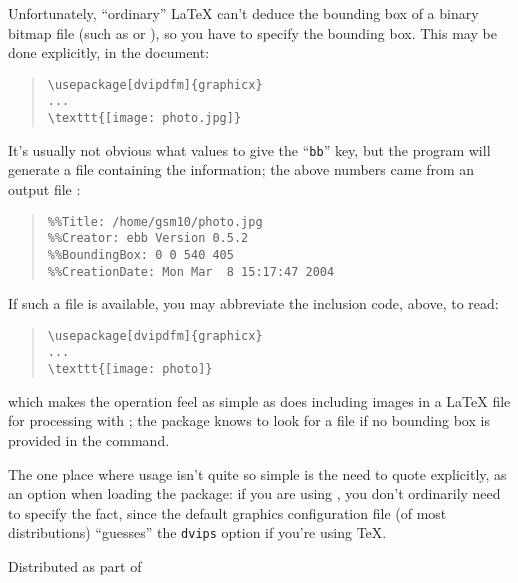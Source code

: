Unfortunately, ``ordinary'' \LaTeX{} can't deduce the bounding box of
a binary bitmap file (such as  or ), so you have
to specify the bounding box.  This may be done explicitly, in the
document:
\begin{quote}
\begin{verbatim}
\usepackage[dvipdfm]{graphicx}
...
\texttt{[image: photo.jpg]}
\end{verbatim}
\end{quote}
It's usually not obvious what values to give the ``\texttt{bb}'' key,
but the program  will generate a file
containing the information; the above numbers came from an
 output file :
\begin{quote}
\begin{verbatim}
%%Title: /home/gsm10/photo.jpg
%%Creator: ebb Version 0.5.2
%%BoundingBox: 0 0 540 405
%%CreationDate: Mon Mar  8 15:17:47 2004
\end{verbatim}
\end{quote}
If such a file is available, you may abbreviate the inclusion
code, above, to read:
\begin{quote}
\begin{verbatim}
\usepackage[dvipdfm]{graphicx}
...
\texttt{[image: photo]}
\end{verbatim}
\end{quote}
which makes the operation feel as simple as does including
 images in a \LaTeX{} file for processing with
; the  package knows to look for a
 file if no bounding box is provided in the
 command.

The one place where usage isn't quite so simple is the need to quote
 explicitly, as an option when loading the
 package: if you are using , you
don't ordinarily need to specify the fact, since the default graphics
configuration file (of most distributions) ``guesses'' the
\texttt{dvips} option if you're using \TeX{}.
\begin{ctanrefs}
\item[dvipdfm]
\item[dvipdfmx]
\item[ebb]Distributed as part of 
\end{ctanrefs}


